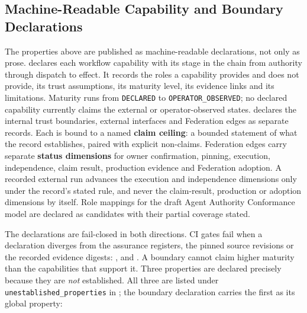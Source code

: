 \documentclass[10pt,twocolumn]{article}
\begin{document}
\subsection{Machine-Readable Capability and Boundary Declarations}
\label{sec:boundary-declarations}

The properties above are published as machine-readable declarations,
not only as prose. 
declares each workflow capability with its stage in the chain from
authority through dispatch to effect. It records the roles a capability
provides and does not provide, its trust assumptions, its maturity
level, its evidence links and its limitations. Maturity runs from
\texttt{DECLARED} to \texttt{OPERATOR\_OBSERVED}; no declared capability
currently claims the external or operator-observed states.
 declares the internal
trust boundaries, external interfaces and Federation edges as separate
records. Each is bound to a named \textbf{claim ceiling}: a bounded
statement of what the record establishes, paired with explicit
non-claims. Federation edges carry separate \textbf{status dimensions}
for owner confirmation, pinning, execution, independence, claim result,
production evidence and Federation adoption. A recorded external run
advances the execution and independence dimensions only under the record's
stated rule, and never the claim-result, production or adoption dimensions
by itself. Role mappings for the draft Agent Authority
Conformance model are declared as candidates with their partial
coverage stated.

The declarations are fail-closed in both directions. CI gates fail
when a declaration diverges from the assurance registers, the pinned
source revisions or the recorded evidence digests:
,
 and
. A boundary cannot
claim higher maturity than the capabilities that support it. Three
properties are declared precisely because they are \emph{not}
established. All three are listed under
\texttt{unestablished\_properties} in
; the boundary
declaration carries the first as its global property:
\end{document}
